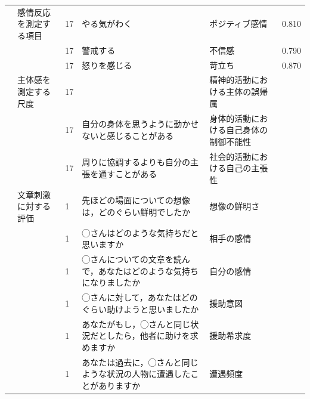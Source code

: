 \begin{landscape}
\begin{longtable}{p{2cm}p{2cm}p{2cm}p{6cm}p{2cm}p{2cm}}
		                         & 感情反応を測定する項目                      & 17  & やる気がわく                                              & ポジティブ感情              & 0.810      \\
		                         &                                  & 17  & 警戒する                                                & 不信感                  & 0.790      \\
		                         &                                  & 17  & 怒りを感じる                                              & 苛立ち                  & 0.870      \\
		\textcite{Niikuni202192}    & 主体感を測定する尺度                       & 17  &                                                     & 精神的活動における主体の誤帰属      &            \\
		                         &                                  & 17  & 自分の身体を思うように動かせないと感じることがある                           & 身体的活動における自己身体の制御不能性  &            \\
		                         &                                  & 17  & 周りに協調するよりも自分の主張を通すことがある                             & 社会的活動における自己の主張性      &            \\
		\textcite{Toyoda202192}     & 文章刺激に対する評価                       & 1   & 先ほどの場面についての想像は，どのぐらい鮮明でしたか                          & 想像の鮮明さ               &            \\
		                         &                                  & 1   & ◯さんはどのような気持ちだと思いますか                                 & 相手の感情                &            \\
		                         &                                  & 1   & ◯さんについての文章を読んで，あなたはどのような気持ちになりましたか                  & 自分の感情                &            \\
		                         &                                  & 1   & ◯さんに対して，あなたはどのぐらい助けようと思いましたか                        & 援助意図                 &            \\
		                         &                                  & 1   & あなたがもし，◯さんと同じ状況だとしたら，他者に助けを求めますか                    & 援助希求度                &            \\
		                         &                                  & 1   & あなたは過去に，◯さんと同じような状況の人物に遭遇したことがありますか                 & 遭遇頻度                 &            \\

\end{longtable}
\end{landscape}
